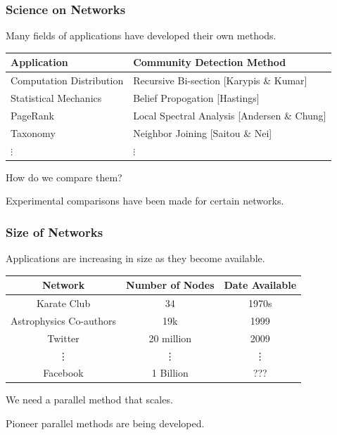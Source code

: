 \documentclass{beamer}
\begin{document}
\begin{frame}\frametitle{Science on Networks}

Many fields of applications have developed their own methods.

\begin{table}[!h]
\centering
\begin{tabular}{l|l}
Application & Community Detection Method \\ \hline
Computation Distribution & Recursive Bi-section [Karypis \& Kumar] \\
Statistical Mechanics & Belief Propogation [Hastings]\\
PageRank & Local Spectral Analysis [Andersen \& Chung] \\
Taxonomy & Neighbor Joining [Saitou \& Nei] \\
$\vdots$ & $\vdots$
\end{tabular}
\end{table}

\begin{block}{}
\begin{center}
How do we compare them?
\end{center}
\end{block}
Experimental comparisons have been made for certain networks.

\end{frame}



\begin{frame}\frametitle{Size of Networks}
Applications are increasing in size as they become available.

\begin{table}[!h]
\centering
\begin{tabular}{c|c|c}
Network & Number of Nodes & Date Available \\ \hline
Karate Club & 34 & 1970s \\
Astrophysics Co-authors & 19k & 1999 \\
Twitter & 20 million & 2009\\
\vdots & \vdots & \vdots \\
Facebook & 1 Billion & ???
\end{tabular}
\end{table}

\begin{block}{}
\begin{center}
We need a parallel method that scales.
\end{center}
\end{block}
Pioneer parallel methods are being developed.

\end{frame}
\end{document}
